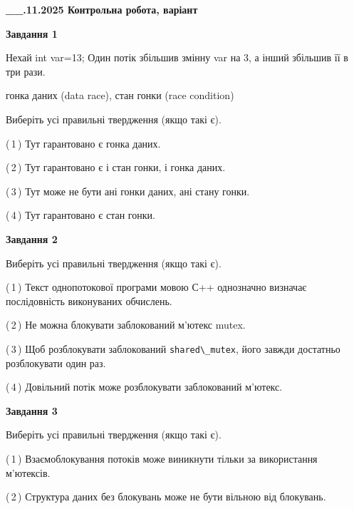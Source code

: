 \documentclass[12pt, ukrainian]{article}
\def\code#1{\Verb!#1!}
\begin{document}
\begin {large}

\textbf{\_\_.11.2025 Контрольна робота, варіант  }\par


{

\begin{center}
\textbf{Завдання 1}
\end{center}
Нехай int var=13; Один потік збільшив змінну var на 3, а інший збільшив її в три рази.

гонка даних (data race), стан гонки (race condition)

Виберіть усі правильні твердження (якщо такі є).\par
\vspace{2mm}
(\,1\,) Тут гарантовано є гонка даних.%

(\,2\,) Тут гарантовано є і стан гонки, і гонка даних.%

(\,3\,) Тут може не бути ані гонки даних, ані стану гонки.%

(\,4\,) Тут гарантовано є стан гонки.%



\begin{center}
\textbf{Завдання 2}
\end{center}
Виберіть усі правильні твердження (якщо такі є).\par
\vspace{2mm}

(\,1\,) Текст однопотокової програми мовою С++ однозначно визначає послідовність виконуваних обчислень.%

(\,2\,) Не можна блокувати заблокований м’ютекс mutex.%

(\,3\,) Щоб розблокувати заблокований \code{shared\_mutex}, його завжди достатньо розблокувати один раз.%

(\,4\,) Довільний потік може розблокувати заблокований м’ютекс.%



\begin{center}
\textbf{Завдання 3}
\end{center}
Виберіть усі правильні твердження (якщо такі є).\par
\vspace{2mm}

(\,1\,) Взаємоблокування потоків може виникнути тільки за використання м’ютексів.%

(\,2\,) Структура даних без блокувань може не бути вільною від блокувань.%

}
\end{large}
\end{document}
